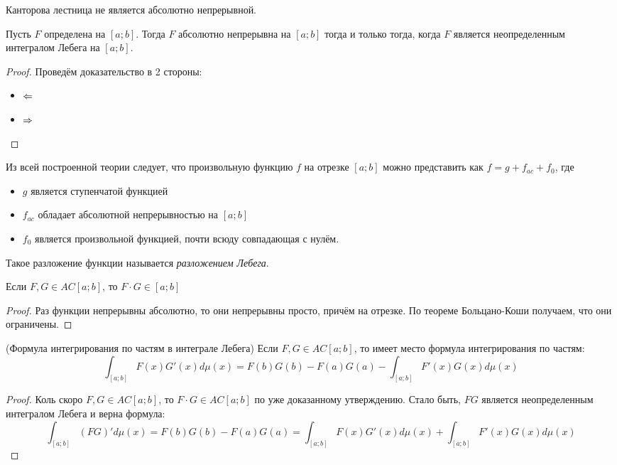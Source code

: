 \begin{corollary}
	Канторова лестница не является абсолютно непрерывной.
\end{corollary}

\begin{theorem}
	Пусть $F$ определена на $[a; b]$. Тогда $F$ абсолютно непрерывна на $[a; b]$ тогда и только тогда, когда $F$ является неопределенным интегралом Лебега на $[a; b]$.
\end{theorem}

\begin{proof}
	Проведём доказательство в 2 стороны:
	\begin{itemize}
		\item $\Leftarrow$
		
		\item $\Rightarrow$
	\end{itemize}
\end{proof}

\begin{note}
	Из всей построенной теории следует, что произвольную функцию $f$ на отрезке $[a; b]$ можно представить как $f = g + f_{ac} + f_0$, где
	\begin{itemize}
		\item $g$ является ступенчатой функцией
		
		\item $f_{ac}$ обладает абсолютной непрерывностью на $[a; b]$
		
		\item $f_0$ является произвольной функцией, почти всюду совпадающая с нулём.
	\end{itemize}
	Такое разложение функции называется \textit{разложением Лебега}.
\end{note}

\begin{proposition}
	Если $F, G \in AC[a; b]$, то $F \cdot G \in [a; b]$
\end{proposition}

\begin{proof}
	Раз функции непрерывны абсолютно, то они непрерывны просто, причём на отрезке. По теореме Больцано-Коши получаем, что они ограничены.
\end{proof}

\begin{corollary} (Формула интегрирования по частям в интеграле Лебега)
	Если $F, G \in AC[a; b]$, то имеет место формула интегрирования по частям:
	\[
		\int_{[a; b]} F(x)G'(x)d\mu(x) = F(b)G(b) - F(a)G(a) - \int_{[a; b]} F'(x)G(x)d\mu(x)
	\]
\end{corollary}

\begin{proof}
	Коль скоро $F, G \in AC[a; b]$, то $F \cdot G \in AC[a; b]$ по уже доказанному утверждению. Стало быть, $FG$ является неопределенным интегралом Лебега и верна формула:
	\[
		\int_{[a; b]} (FG)'d\mu(x) = F(b)G(b) - F(a)G(a) = \int_{[a; b]} F(x)G'(x)d\mu(x) + \int_{[a; b]} F'(x)G(x)d\mu(x)
	\]
\end{proof}
